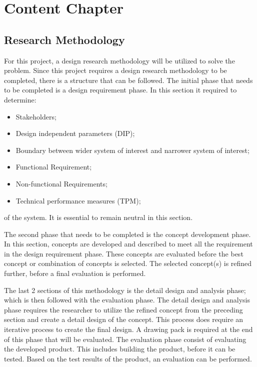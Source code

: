 \chapter{Content Chapter}
\label{sec:Content Chapter}


\section{Research Methodology}
\label{sec:Research Methodology}

 For this project, a design research methodology will be utilized to solve the problem. Since this project requires a design research methodology to be completed, there is a structure that can be followed. The initial phase that needs to be completed is a design requirement phase. In this section it required to determine:

\begin{itemize}
    \item Stakeholders;
    \item Design independent parameters (DIP);
    \item Boundary between wider system of interest and narrower system of interest;
    \item Functional Requirement;
    \item Non-functional Requirements;
    \item Technical performance measures (TPM);
\end{itemize}

of the system. It is essential to remain neutral in this section.


The second phase that needs to be completed is the concept development phase. In this section, concepts are developed and described to meet all the requirement in the design requirement phase. These concepts are evaluated before the best concept or combination of concepts is selected. The selected concept(s) is refined further, before a final evaluation is performed.


The last 2 sections of this methodology is the detail design and analysis phase; which is then followed with the evaluation phase. The detail design and analysis phase requires the researcher to utilize the refined concept from the preceding section and create a detail design of the concept. This process does require an iterative process to create the final design. A drawing pack is required at the end of this phase that will be evaluated. The evaluation phase consist of evaluating the developed product. This includes building the product, before it can be tested. Based on the test results of the product, an evaluation can be performed.


